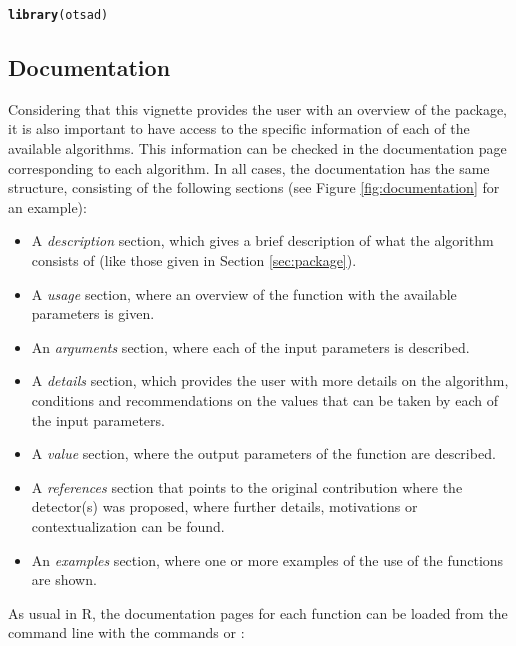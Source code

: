 \documentclass[a4paper]{article}\usepackage[]{graphicx}\usepackage[]{color}
\makeatletter
\newcommand{\hlstd}[1]{\textcolor[rgb]{0.345,0.345,0.345}{#1}}%
\newcommand{\hlkwd}[1]{\textcolor[rgb]{0.737,0.353,0.396}{\textbf{#1}}}%
\newenvironment{kframe}{%
 \def\at@end@of@kframe{}%
 \ifinner\ifhmode%
  \def\at@end@of@kframe{\end{minipage}}%
  \begin{minipage}{\columnwidth}%
 \fi\fi%
 \def\FrameCommand##1{\hskip\@totalleftmargin \hskip-\fboxsep
 \colorbox{shadecolor}{##1}\hskip-\fboxsep
     \hskip-\linewidth \hskip-\@totalleftmargin \hskip\columnwidth}%
 \MakeFramed {\advance\hsize-\width
   \@totalleftmargin\z@ \linewidth\hsize
   \@setminipage}}%
 {\par\unskip\endMakeFramed%
 \at@end@of@kframe}
\newenvironment{knitrout}{}{} %
\makeatother
\begin{document}
\begin{knitrout}
\color{fgcolor}\begin{kframe}
\begin{alltt}
\hlkwd{library}\hlstd{(otsad)}
\end{alltt}
\end{kframe}
\end{knitrout}

\subsection{Documentation}\label{sec:documentation}

Considering that this vignette provides the user with an overview of the  package, it is also important to have access to the specific information of each of the available algorithms. This information can be checked in the documentation page corresponding to each algorithm. In all cases, the documentation has the same structure, consisting of the following sections (see Figure \ref{fig:documentation} for an example):

\begin{itemize}
\item A \emph{description} section, which gives a brief description of what the algorithm consists of (like those given in Section \ref{sec:package}).
\item A \emph{usage} section, where an overview of the function with the available parameters is given.
\item An \emph{arguments} section, where each of the input parameters is described.
\item A \emph{details} section, which provides the user with more details on the algorithm, conditions and recommendations on the values that can be taken by each of the input parameters.
\item A \emph{value} section, where the output parameters of the function are described.
\item A \emph{references} section that points to the original contribution where the detector(s) was proposed, where further details, motivations or contextualization can be found.
\item An \emph{examples} section, where one or more examples of the use of the functions are shown.
\end{itemize}

As usual in R, the documentation pages for each function can be loaded from the command line with the commands  or :
\end{document}
